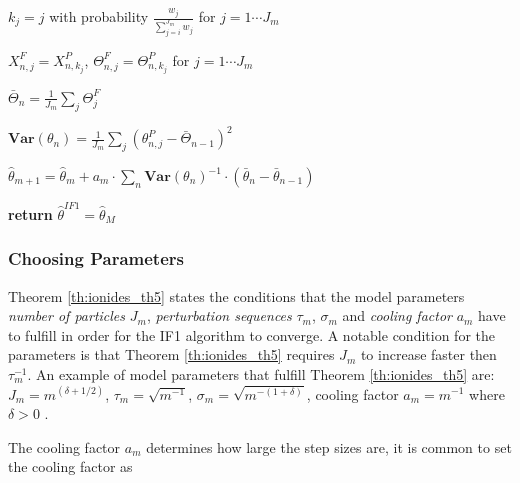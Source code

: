 \documentclass[twoside,openright]{report}
\begin{document}
\begin{algorithm}
\begin{algorithmic}
            \State $k_j = j$ with probability $\frac{w_j}{ \sum_{j = i}^{J_m} w_j }$ for $j = 1 \cdots J_m$  
            
            \State   $X^{F}_{n,j} = X^P_{n,k_j }$, $\Theta^{F}_{n,j} = \Theta^{P}_{n,k_j }$ for $j = 1 \cdots J_m$
            
            \State $\bar{\Theta}_{n} = \frac{1}{J_m} \sum_{j} \Theta^{F}_j $ 
            
            \State $\mathbf{Var} (\theta_n ) = \frac{1}{J_m} \sum_{j} ( \theta^{P}_{n,j} - \bar{\Theta}_{n-1})^2$ 
        
        \EndFor
        
        \State $\hat{\theta}_{m+1} = \hat{\theta}_{m} + a_m \cdot \sum_{n} \mathbf{Var} ( \theta_n ) ^{-1} \cdot ( \bar{\theta}_{n} - \bar{\theta}_{n-1} )$
    
    \EndFor

\State \textbf{return} $\hat{\theta}^{IF1} = \hat{\theta}_M$

\end{algorithmic}
\end{algorithm}

\subsubsection{Choosing Parameters} 
Theorem \ref{th:ionides_th5} states the conditions that the model parameters  \textit{number of particles} $J_m$, \textit{perturbation sequences} $\tau_m$, $\sigma_m$ and \textit{cooling factor} $a_m$ have to fulfill in order for the IF1 algorithm to converge. A notable condition for the parameters is that  Theorem \ref{th:ionides_th5} requires   $J_m$ to increase faster then $\tau_m ^{-1}$. An example of model parameters that fulfill Theorem  \ref{th:ionides_th5} are: $J_m = m^{(\delta + 1/2)}$, $\tau_m = \sqrt{m^{-1}}$, $\sigma_m = \sqrt{m^{-(1 + \delta)}}$, cooling factor $a_m = m^{-1}$ where $\delta > 0$ \cite{ionides2011iterated}. 

The cooling factor $a_m$ determines how large the step sizes are, it is common to set the cooling factor as \cite{spall2005introduction}
\end{document}

